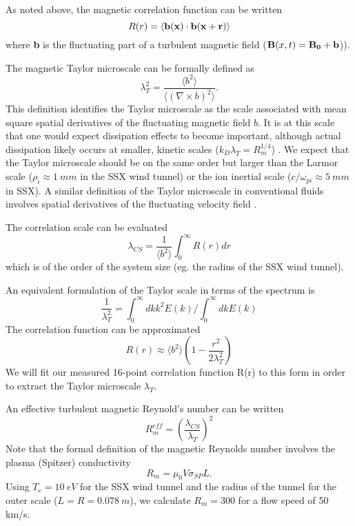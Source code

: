 \documentclass[aip,prl,amsmath,amssymb,reprint,superscriptaddress]{revtex4-1} %
\begin{document}
As noted above, the magnetic correlation function can be written
%
\begin{equation}
R(r) =  \langle {\bf b(x) \cdot b(x + r)} \rangle
\end{equation}
%
where {\bf b} is the fluctuating part of a turbulent magnetic field (${\bf B}(x, t) = {\bf B_0 + b}$)). 

The magnetic Taylor microscale can be formally defined as
%
\begin{equation}
\lambda_T^2 = \frac{\langle b^2 \rangle}{\langle (\nabla \times b)^2 \rangle}.
\label{eq:tayscale}
\end{equation}
%
This definition identifies the Taylor microscale as the scale associated with mean square spatial derivatives of the fluctuating magnetic field $b$.  It is at this scale that one would expect dissipation effects to become important, although actual dissipation likely occurs at smaller, kinetic scales ($k_D \lambda_T = R_m^{1/4}$) \cite{Matthaeus08}.  We expect that the Taylor microscale should be on the same order but larger than the Larmor scale ($\rho_i \approx 1~mm$ in the SSX wind tunnel) or the ion inertial scale ($c/\omega_{pi} \approx 5~mm$ in SSX).  A similar definition of the Taylor microscale in conventional fluids involves spatial derivatives of the fluctuating velocity field \cite{frisch95}.

The correlation scale can be evaluated
%
\begin{equation}
\lambda_{CS}  = \frac{1}{\langle b^2 \rangle} \int_0^\infty R(r) dr
\label{eq:tayscale2}
\end{equation}
%
which is of the order of the system size (eg. the radius of the SSX wind tunnel).

An equivalent formulation of the Taylor scale in terms of the spectrum is
%
\begin{equation}
\frac{1}{\lambda_T^2}  = \int_0^\infty dk k^2 E(k)/\int_0^\infty dk E(k)
\label{eq:tayscale3}
\end{equation}
%
The correlation function can be approximated
\begin{equation}
R(r) \approx  \langle b^2 \rangle \left(1 - \frac{r^2}{2 \lambda_T^2}  \right)
\label{eq:correlation2}  
\end{equation}
%
We will fit our measured 16-point correlation function R(r) to this form in order to extract the Taylor microscale $\lambda_T$. 

An effective turbulent magnetic Reynold's number can be written \cite{Batchelor70}
%
\begin{equation}
R_m^{eff}  = \left(\frac{\lambda_{CS}}{\lambda_T} \right)^2
\label{eq:magReynNum}
\end{equation}
%
Note that the formal definition of the magnetic Reynolds number involves the plasma (Spitzer) conductivity
\begin{equation}
R_m = \mu_0 V \sigma_{SP} L.
\label{eq:magReynNum2} 
\end{equation}
%
Using $T_e = 10~eV$ for the SSX wind tunnel and the radius of the tunnel for the outer scale ($L = R = 0.078~m$), we calculate $R_m = 300$ for a flow speed of 50 km/s.
\end{document}
